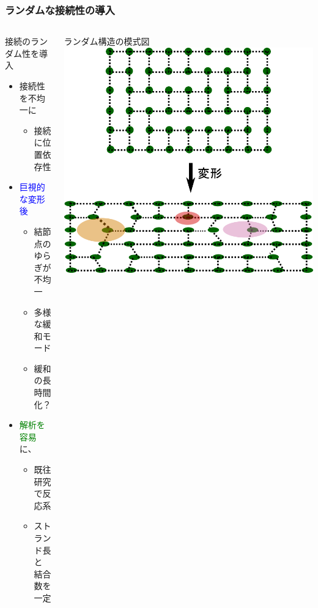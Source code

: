 \documentclass[12pt, dvipdfmx]{beamer}
\begin{document}
\begin{frame}
    \frametitle{ランダムな接続性の導入}
    \vspace{-3mm}
		\begin{columns}[totalwidth=1\textwidth]
				\begin{block}{接続のランダム性を導入}
					\begin{itemize}
						\item 接続性を不均一に
							\begin{itemize}
								\item 接続に\alert{位置依存性}
							\end{itemize}
						\item \textcolor{blue}{巨視的な変形後}
							\begin{itemize}
								\item 結節点のゆらぎが\\不均一
								\item 多様な緩和モード
								\item \alert{緩和の長時間化？}
							\end{itemize}
						\item \textcolor{green}{解析を容易}に、
                            \begin{itemize}
                                \item 既往研究で反応系
								\item \alert{ストランド長と\\結合数を一定}
							\end{itemize}
					\end{itemize}
				\end{block}
				ランダム構造の模式図
				\vspace{5mm}
				\includegraphics[width=\textwidth]{random_NW.png}
    \end{columns}
\end{frame}
\end{document}
